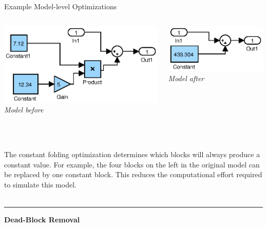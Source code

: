 \documentclass[final,hyperref={pdfpagelabels=false}]{beamer}
\begin{document}
\begin{frame}{}
\begin{columns}[t,totalwidth=\linewidth]
\begin{column}{.585\linewidth}
\begin{block}{Example Model-level Optimizations}
\begin{columns}[c,totalwidth=\linewidth]
\begin{column}{.485\linewidth}
\begin{center}
        \includegraphics[width=0.8\linewidth]{images/models/Const1}\\
        \footnotesize \textit{Model before}
        \end{center}
        \end{column}
        \begin{column}{.485\linewidth}
        \begin{center}
        \includegraphics[width=0.7\linewidth]{images/models/Const1_export}\\
        \footnotesize \textit{Model after}
        \end{center}
        \end{column}
        \end{columns}
        \footnotesize ~\\~\\
        The constant folding optimization determines which blocks will always produce a constant value. For example, the four blocks on the left in the original model can be replaced by one constant block. This reduces the computational effort required to simulate this model.
         ~\\~\\
         \hrule
         
         \small
          \begin{center}\textbf{Dead-Block Removal}\end{center}
                 \vspace{-0.3cm}
         \begin{columns}[c,totalwidth=\linewidth]
         \begin{column}{.485\linewidth}
         \begin{center}
         

\end{center}
\end{column}
\end{columns}
\end{block}
\end{column}
\end{columns}
\end{frame}
\end{document}

